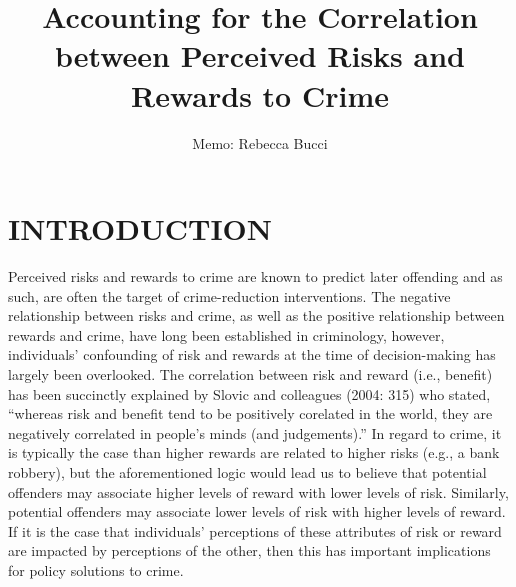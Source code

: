 \documentclass{article} %
\title{Accounting for the Correlation between Perceived Risks and Rewards to Crime}
\author{Memo: Rebecca Bucci}
\begin{document}
\maketitle















\section{INTRODUCTION}

Perceived risks and rewards to crime are known to predict later offending and as such, are often the target of crime-reduction interventions. The negative relationship between risks and crime, as well as the positive relationship between rewards and crime, have long been established in criminology, however, individuals’ confounding of risk and rewards at the time of decision-making has largely been overlooked. The correlation between risk and reward (i.e., benefit) has been succinctly explained by Slovic and colleagues (2004: 315) who stated, “whereas risk and benefit tend to be positively corelated in the world, they are negatively correlated in people’s minds (and judgements).” In regard to crime, it is typically the case than higher rewards are related to higher risks (e.g., a bank robbery), but the aforementioned logic would lead us to believe that potential offenders may associate higher levels of reward with lower levels of risk. Similarly, potential offenders may associate lower levels of risk with higher levels of reward. If it is the case that individuals’ perceptions of these attributes of risk or reward are impacted by perceptions of the other, then this has important implications for policy solutions to crime. 
\end{document}
